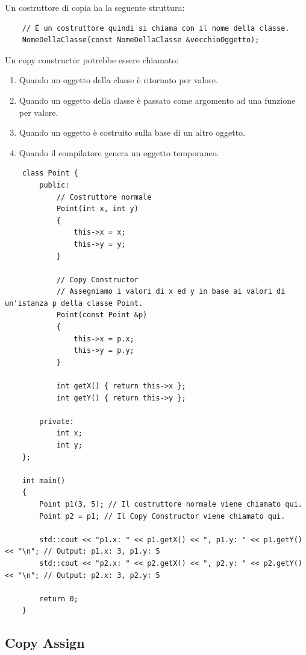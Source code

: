 \textsf{\small Un costruttore di copia ha la seguente struttura: } \\

\begin{lstlisting}
	// È un costruttore quindi si chiama con il nome della classe.
	NomeDellaClasse(const NomeDellaClasse &vecchioOggetto);
\end{lstlisting}

\textsf{\small Un copy constructor potrebbe essere chiamato:}

\begin{enumerate}
	\item \textsf{\small Quando un oggetto della classe è ritornato per valore.}
	\item \textsf{\small Quando un oggetto della classe è passato come argomento ad una funzione per valore.}
	\item \textsf{\small Quando un oggetto è costruito sulla base di un altro oggetto.}
	\item \textsf{\small Quando il compilatore genera un oggetto temporaneo.}
\end{enumerate}

\begin{lstlisting}
	class Point {
		public:
			// Costruttore normale
			Point(int x, int y)
			{
				this->x = x;
				this->y = y;
			}
			
			// Copy Constructor
			// Assegniamo i valori di x ed y in base ai valori di un'istanza p della classe Point.
			Point(const Point &p)
			{
				this->x = p.x;
				this->y = p.y;
			}
		
			int getX() { return this->x };
			int getY() { return this->y };
		
		private:
			int x;
			int y;
	};

	int main()
	{
		Point p1(3, 5); // Il costruttore normale viene chiamato qui.
		Point p2 = p1; // Il Copy Constructor viene chiamato qui.
		
		std::cout << "p1.x: " << p1.getX() << ", p1.y: " << p1.getY() << "\n"; // Output: p1.x: 3, p1.y: 5
		std::cout << "p2.x: " << p2.getX() << ", p2.y: " << p2.getY() << "\n"; // Output: p2.x: 3, p2.y: 5
		
		return 0;
	}
\end{lstlisting}

\subsection{Copy Assign}

